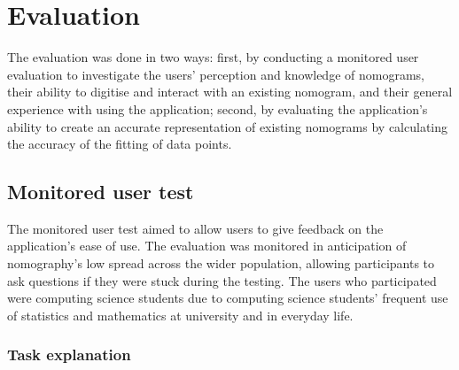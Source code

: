 \documentclass{l4proj}
\begin{document}
\chapter{Evaluation} \label{evaluation}

The evaluation was done in two ways: first, by conducting a monitored user evaluation to investigate the users' perception and knowledge of nomograms, their ability to digitise and interact with an existing nomogram, and their general experience with using the application; second, by evaluating the application's ability to create an accurate representation of existing nomograms by calculating the accuracy of the fitting of data points. 

\section{Monitored user test} 

The monitored user test aimed to allow users to give feedback on the application's ease of use. The evaluation was monitored in anticipation of nomography's low spread across the wider population, allowing participants to ask questions if they were stuck during the testing. The users who participated were computing science students due to computing science students' frequent use of statistics and mathematics at university and in everyday life. 

\subsection{Task explanation}
\end{document}
